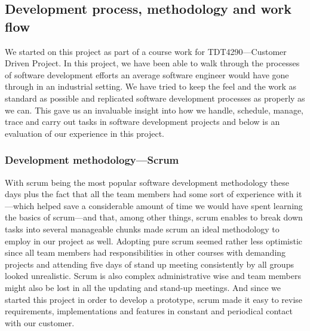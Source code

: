 \subsection{Development process, methodology and work flow}

We started on this project as part of a course work for TDT4290---Customer Driven Project. In this project, we have been able to walk through the processes of software development efforts an average software engineer would have gone through in an industrial setting. We have tried to keep the feel and the work as standard as possible and replicated software development processes as properly as we can. This gave us an invaluable insight into how we handle, schedule, manage, trace and carry out tasks in software development projects and below is an evaluation of our experience in this project.
	\subsubsection{Development methodology---Scrum}

With scrum being the most popular software development methodology these days plus the fact that all the team members had some sort of experience with it---which helped save a considerable amount of time we would have spent learning the basics of scrum---and that, among other things, scrum enables to break down tasks into several manageable chunks made scrum an ideal methodology to employ in our project as well. Adopting pure scrum seemed rather less optimistic since all team members had responsibilities in other courses with demanding projects and attending five days of stand up meeting consistently by all groups looked unrealistic. Scrum is also complex administrative wise and team members might also be lost in all the updating and stand-up meetings. And since we started this project in order to develop a prototype, scrum made it easy to revise requirements, implementations and features in constant and periodical contact with our customer.

